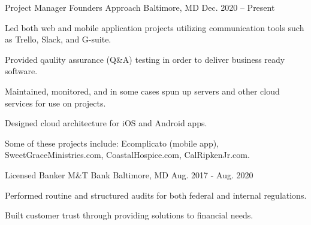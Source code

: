

\begin{cventries}
\cventry
{Project Manager} %
{Founders Approach} %
{Baltimore, MD} %
{Dec. 2020 -- Present} %
{
      \begin{cvitems} 
        \item {Led both web and mobile application projects utilizing communication tools such as Trello, Slack, and G-suite.}
        \item {Provided qaulity assurance (Q\&A) testing in order to deliver business ready software.}
        \item {Maintained, monitored, and in some cases spun up servers and other cloud services for use on projects.}
        \item {Designed cloud architecture for iOS and Android apps.}
        \item {Some of these projects include: Ecomplicato (mobile app), SweetGraceMinistries.com, CoastalHospice.com, CalRipkenJr.com.}
      \end{cvitems}
    }

\cventry
{Licensed Banker} %
{M\&T Bank} %
{Baltimore, MD} %
{Aug. 2017 - Aug. 2020} %
{
  \begin{cvitems} %
    \item {Performed routine and structured audits for both federal and internal regulations.}
    \item {Built customer trust through providing solutions to financial needs.}
  \end{cvitems}
}

\end{cventries}